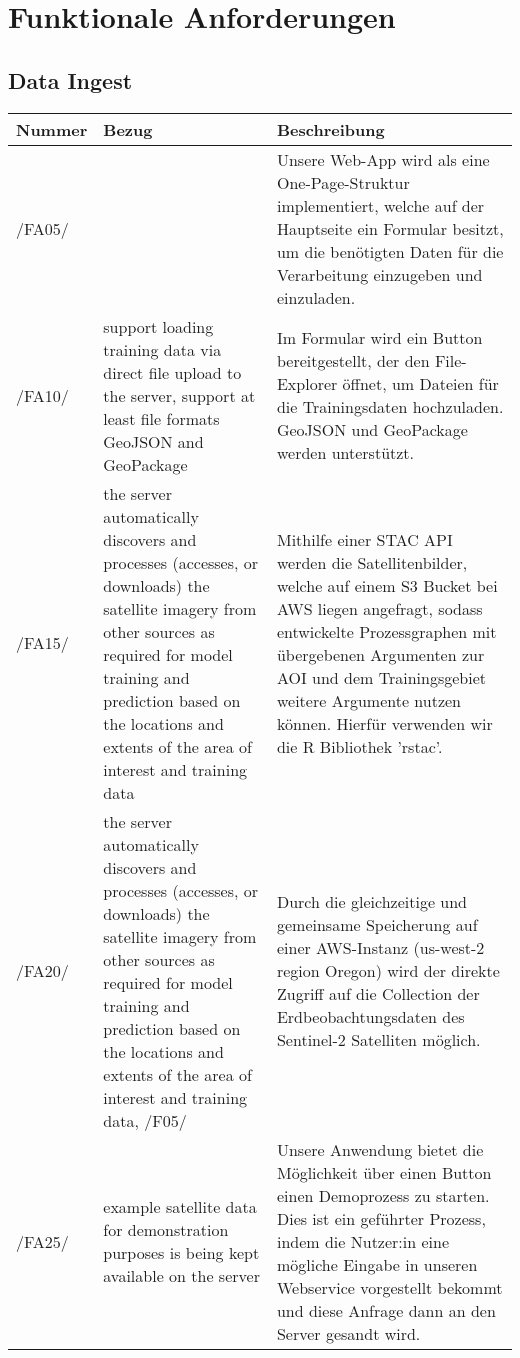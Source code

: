 \documentclass[a4paper,12pt]{article}
\newcommand{\addrow}[3]{#1 &#2 &#3 \\ [0.2cm]}
\newcommand{\addheading}[3]{#1 &#2 &#3\\ \hline }
\newcommand{\tabularhead}{\begin{tabular}{l p{5cm} p{8cm}}
\hline
}
\newenvironment{usecase}{\tabularhead}
{\hline\end{tabular}}
\begin{document}
\section{Funktionale Anforderungen}

\subsection{Data Ingest}

\begin{usecase}

  \addheading{Nummer}{Bezug}{Beschreibung} 
  \addrow{/FA05/}{}{Unsere Web-App wird als eine One-Page-Struktur implementiert, welche auf der Hauptseite ein Formular besitzt, um die benötigten Daten für die Verarbeitung einzugeben und einzuladen.} 
  \addrow{/FA10/}{support loading training data via direct file upload to the server, support at least file formats GeoJSON and GeoPackage}{Im Formular wird ein Button bereitgestellt, der den File-Explorer öffnet, um Dateien für die Trainingsdaten hochzuladen. GeoJSON und GeoPackage werden unterstützt.} 
  \addrow{/FA15/}{the server automatically discovers and processes (accesses, or downloads) the
satellite imagery from other sources as required for model training and prediction based on the locations and extents of the area of interest and training
data} {Mithilfe einer STAC API werden die Satellitenbilder, welche auf einem S3 Bucket bei AWS liegen angefragt, sodass entwickelte Prozessgraphen mit übergebenen Argumenten zur AOI und dem Trainingsgebiet weitere Argumente nutzen können. Hierfür verwenden wir die R Bibliothek 'rstac'.}
  \addrow{/FA20/}{the server automatically discovers and processes (accesses, or downloads) the
satellite imagery from other sources as required for model training and prediction based on the locations and extents of the area of interest and training
data, /F05/}{Durch die gleichzeitige und gemeinsame Speicherung auf einer AWS-Instanz (us-west-2 region Oregon) wird der direkte Zugriff auf die Collection der Erdbeobachtungsdaten des Sentinel-2 Satelliten möglich.}
  \addrow{/FA25/}{example satellite data for demonstration purposes is being kept available on the
server}{Unsere Anwendung bietet die Möglichkeit über einen Button einen Demoprozess zu starten. Dies ist ein geführter Prozess, indem die Nutzer:in eine mögliche Eingabe in unseren Webservice vorgestellt bekommt und diese Anfrage dann an den Server gesandt wird.}

\end{usecase}
\end{document}
